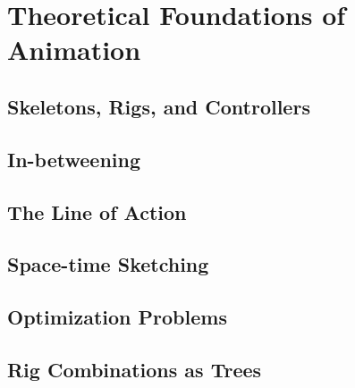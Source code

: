 \chapter{Theoretical Foundations of Animation}

\section{Skeletons, Rigs, and Controllers}


\section{In-betweening}


\section{The Line of Action}


\section{Space-time Sketching}


\section{Optimization Problems}


\section{Rig Combinations as Trees}
